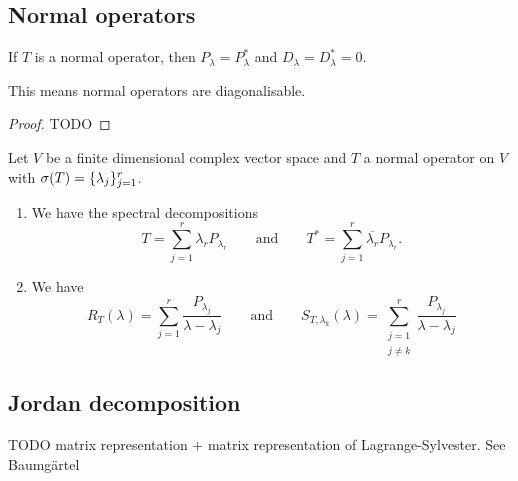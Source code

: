 \subsection{Normal operators}


\begin{proposition}
If $T$ is a normal operator, then $P_\lambda = P^*_\lambda$ and $D_\lambda = D^*_\lambda = 0$.
\end{proposition}
This means normal operators are diagonalisable.
\begin{proof}
TODO
\end{proof}
\begin{corollary}
Let $V$ be a finite dimensional complex vector space and $T$ a normal operator
on $V$ with $\sigma(T) = \{\lambda_j\}_{j=1}^r$.
\begin{enumerate}
\item We have the spectral decompositions
\[ T = \sum_{j=1}^r \lambda_r P_{\lambda_r} \qquad\text{and}\qquad T^* = \sum_{j=1}^r \overline{\lambda_r} P_{\lambda_r}. \]
\item We have
\[ R_T(\lambda) = \sum_{j = 1}^r \frac{P_{\lambda_j}}{\lambda - \lambda_j} \qquad \text{and} \qquad S_{T,\lambda_k}(\lambda) = \sum_{\substack{j = 1 \\ j\neq k}}^r \frac{P_{\lambda_j}}{\lambda - \lambda_j} \]
\end{enumerate}
\end{corollary}

\subsection{Jordan decomposition}
TODO matrix representation + matrix representation of Lagrange-Sylvester. See Baumgärtel



